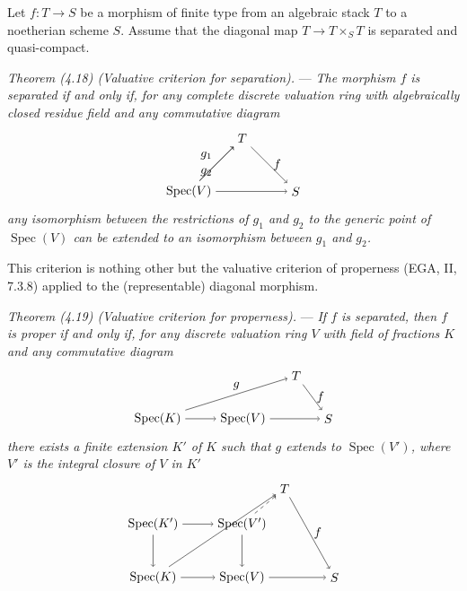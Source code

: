 \documentclass[10pt]{article}
\newcommand{\Spec}{\operatorname{Spec}}
\begin{document}
Let $f:T\to S$ be a morphism of finite type from an algebraic stack $T$ to a noetherian scheme $S$. Assume that the diagonal map $T\to T\times_S T$ is separated and quasi-compact.

\medskip
\noindent\emph{Theorem (4.18) (Valuative criterion for separation).} --- \emph{The morphism $f$ is separated if and only if, for any complete discrete valuation ring with algebraically closed residue field and any commutative diagram}
\[
\begin{tikzpicture}[baseline=(current bounding box.center)]
\node (T) at (1.5,1.5) {$T$};
\node (V) at (0,0) {$\Spec(V)$};
\node (S) at (3,0) {$S$};
\draw[->] (V) -- node[above left] {$g_1$} (T);
\draw[->] (V) -- node[below left] {$g_2$} (T);
\draw[->] (V) -- (S);
\draw[->] (T) -- node[right] {$f$} (S);
\end{tikzpicture}
\]
\emph{any isomorphism between the restrictions of $g_1$ and $g_2$ to the generic point of $\Spec(V)$ can be extended to an isomorphism between $g_1$ and $g_2$.}

This criterion is nothing other but the valuative criterion of properness (EGA, II, 7.3.8) applied to the (representable) diagonal morphism.

\medskip
\noindent\emph{Theorem (4.19) (Valuative criterion for properness).} --- \emph{If $f$ is separated, then $f$ is proper if and only if, for any discrete valuation ring $V$ with field of fractions $K$ and any commutative diagram}
\[
\begin{tikzpicture}[baseline=(current bounding box.center)]
\node (K) at (0,0) {$\Spec(K)$};
\node (V) at (2.4,0) {$\Spec(V)$};
\node (T) at (3.9,1.2) {$T$};
\node (S) at (4.8,0) {$S$};
\draw[->] (K) -- (V);
\draw[->] (V) -- (S);
\draw[->] (T) -- node[right] {$f$} (S);
\draw[->] (K) -- node[above] {$g$} (T);
\end{tikzpicture}
\]
\emph{there exists a finite extension $K'$ of $K$ such that $g$ extends to $\Spec(V')$, where $V'$ is the integral closure of $V$ in $K'$}
\[
\begin{tikzpicture}[baseline=(current bounding box.center)]
\node (Kp) at (0,1.5) {$\Spec(K')$};
\node (Vp) at (2.5,1.5) {$\Spec(V')$};
\node (T) at (3.7,2.5) {$T$};
\node (K) at (0,0) {$\Spec(K)$};
\node (V) at (2.5,0) {$\Spec(V)$};
\node (S) at (5.1,0) {$S$};
\draw[->] (Kp) -- (Vp);
\draw[->] (K) -- (V);
\draw[->] (Kp) -- (K);
\draw[->] (Vp) -- (V);
\draw[->] (V) -- (S);
\draw[->] (T) -- node[right] {$f$} (S);
\draw[->] (K) -- (T);
\draw[->,dashed] (Vp) -- (T);
\end{tikzpicture}
\]
\end{document}
